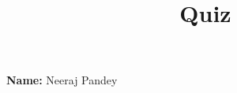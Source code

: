\documentclass[12pt,twoside]{article}
\title{Quiz}
\begin{document}

\setlength{\parindent}{0pt}
\medskip\hrulefill\medskip

{\bf Name:} Neeraj Pandey

\medskip\hrulefill






\end{document}
